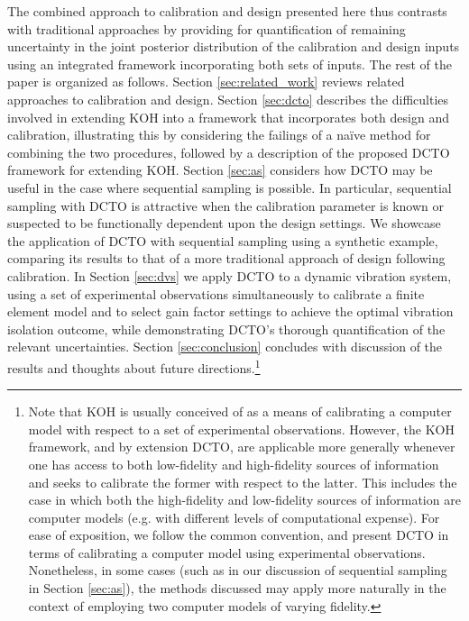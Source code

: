 \documentclass[10pt]{asme2ej}
\begin{document}
%
The combined approach to calibration and design presented here thus contrasts with traditional approaches by providing for quantification of remaining uncertainty in the joint posterior distribution of the calibration and design inputs using an integrated framework incorporating both sets of inputs.
%
The rest of the paper is organized as follows.
%
Section \ref{sec:related_work} reviews related approaches to calibration and design.
%
Section \ref{sec:dcto} describes the difficulties involved in extending KOH into a framework that incorporates both design and calibration, illustrating this by considering the failings of a na\"ive method for combining the two procedures, followed by a description of the proposed DCTO framework for extending KOH.
%
%
Section \ref{sec:as} considers how DCTO may be useful in the case where sequential sampling is possible.
%
In particular, sequential sampling with DCTO is attractive when the calibration parameter is known or suspected to be functionally dependent upon the design settings.
%
We showcase the application of DCTO with sequential sampling using a synthetic example, comparing its results to that of a more traditional approach of design following calibration.
%
In Section \ref{sec:dvs} we apply DCTO to a dynamic vibration system, using a set of experimental observations simultaneously to calibrate a finite element model and to select gain factor settings to achieve the optimal vibration isolation outcome, while demonstrating DCTO's thorough quantification of the relevant uncertainties.
%
Section \ref{sec:conclusion} concludes with discussion of the results and thoughts about future directions.\footnote{
	Note that KOH is usually conceived of as a means of calibrating a computer model with respect to a set of experimental observations.
	However, the KOH framework, and by extension DCTO, are applicable more generally whenever one has access to both low-fidelity and high-fidelity sources of information and seeks to calibrate the former with respect to the latter.
	This includes the case in which both the high-fidelity and low-fidelity sources of information are computer models (e.g. with different levels of computational expense).
	For ease of exposition, we follow the common convention, and present DCTO in terms of calibrating a computer model using experimental observations.
	Nonetheless, in some cases (such as in our discussion of sequential sampling in Section \ref{sec:as}), the methods discussed may apply more naturally in the context of employing two computer models of varying fidelity.
}
%
\end{document}
